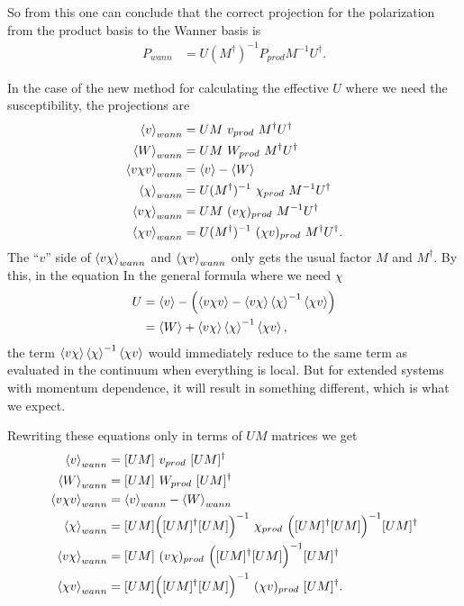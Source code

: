 \documentclass[12pt,a4paper]{scrartcl}
\numberwithin{equation}{section}
\begin{document}
So from this one can conclude that the correct projection for the polarization
from the product basis to the Wanner basis is
\begin{align}
 P_{wann} &= U (M^{\dagger})^{-1}  P_{prod}  M^{-1} U^{\dagger}.
\end{align}

In the case of the new method for calculating the effective $U$ where we need the susceptibility, 
the projections are
\begin{align}
\braket{v}_{wann} &= U M\ v_{prod} \ M^{\dagger} U^{\dagger} \\
 \braket{W}_{wann} &= U M\ W_{prod} \ M^{\dagger} U^{\dagger} \\
 \braket{v\chi v}_{wann} &= \braket{v}-\braket{W}\\
 \braket{\chi}_{wann} &= U (M^{\dagger})^{-1} \ \chi_{prod} \ M^{-1} U^{\dagger}\\
 \braket{v \chi}_{wann} &= U M\  (v \chi)_{prod} \ M^{-1} U^{\dagger}\\
 \braket{\chi v}_{wann} &= U (M^{\dagger})^{-1}\  (\chi v)_{prod} \ M^{\dagger} U^{\dagger}.
\end{align}
The ``$v$'' side of $\braket{v \chi}_{wann}$ and $\braket{\chi v}_{wann}$ only gets the 
usual factor $M$ and $M^{\dagger}$. By this, in the equation
In the general formula where we need  $\chi$
\begin{align}
 U &= \braket{v} - \left( \braket{v \chi v} - \braket{v\chi} \braket{\chi}^{-1} \braket{\chi v} \right) \\
   &= \braket{W} + \braket{v\chi} \braket{\chi}^{-1} \braket{\chi v}  ,
\end{align}
the term $\braket{v\chi} \braket{\chi}^{-1} \braket{\chi v}$ would immediately reduce to the same term
as evaluated in the continuum when everything is local. But for extended systems with momentum dependence,
it will result in something different, which is what we expect.

Rewriting these equations only in terms of $UM$ matrices we get
\begin{align}
\braket{v}_{wann} &= [UM]\  v_{prod} \ [UM]^{\dagger} \\
 \braket{W}_{wann} &= [UM]\ W_{prod} \ [UM]^{\dagger} \\
 \braket{v\chi v}_{wann} &= \braket{v}_{wann}-\braket{W}_{wann}\\
 \braket{\chi}_{wann} &= [UM] \Big( [UM]^{\dagger} [UM] \Big)^{-1} \ \chi_{prod} \ \Big( [UM]^{\dagger} [UM] \Big)^{-1} [UM]^{\dagger}\\
 \braket{v \chi}_{wann} &= [UM]\  (v \chi)_{prod} \ \Big( [UM]^{\dagger} [UM] \Big)^{-1} [UM]^{\dagger}\\
 \braket{\chi v}_{wann} &= [UM] \Big( [UM]^{\dagger} [UM] \Big)^{-1}\  (\chi v)_{prod} \ [UM]^{\dagger}.
\end{align}
\end{document}
